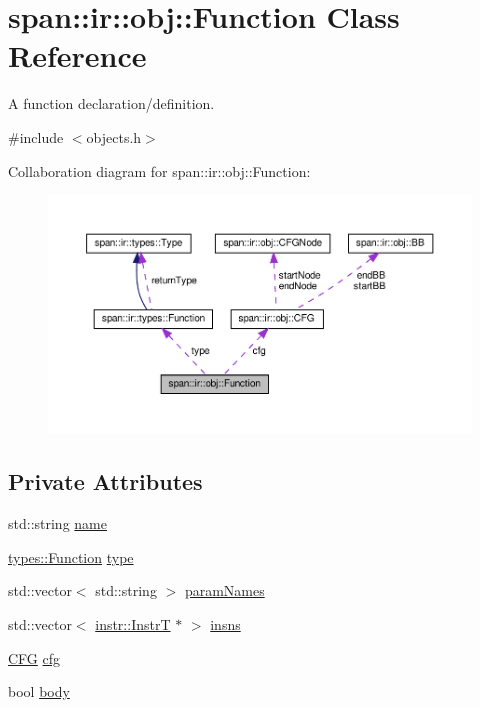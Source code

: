 \hypertarget{classspan_1_1ir_1_1obj_1_1Function}{}\section{span\+:\+:ir\+:\+:obj\+:\+:Function Class Reference}
\label{classspan_1_1ir_1_1obj_1_1Function}


A function declaration/definition.  




{\ttfamily \#include $<$objects.\+h$>$}



Collaboration diagram for span\+:\+:ir\+:\+:obj\+:\+:Function\+:\nopagebreak
\begin{figure}[H]
\begin{center}
\leavevmode
\includegraphics[width=350pt]{classspan_1_1ir_1_1obj_1_1Function__coll__graph}
\end{center}
\end{figure}
\subsection*{Private Attributes}
\begin{DoxyCompactItemize}
\item 
std\+::string \hyperlink{classspan_1_1ir_1_1obj_1_1Function_afb7dc1b55c81492a1243b75734add6ab}{name}
\item 
\hyperlink{classspan_1_1ir_1_1types_1_1Function}{types\+::\+Function} \hyperlink{classspan_1_1ir_1_1obj_1_1Function_af2916d791297d39a30c4c597b73d38b3}{type}
\item 
std\+::vector$<$ std\+::string $>$ \hyperlink{classspan_1_1ir_1_1obj_1_1Function_a1716aaabf39b86d19258a87cde9ba344}{param\+Names}
\item 
std\+::vector$<$ \hyperlink{classspan_1_1ir_1_1instr_1_1InstrT}{instr\+::\+InstrT} $\ast$ $>$ \hyperlink{classspan_1_1ir_1_1obj_1_1Function_a67f2ae04de111d711a08291b7621e6fd}{insns}
\item 
\hyperlink{classspan_1_1ir_1_1obj_1_1CFG}{C\+FG} \hyperlink{classspan_1_1ir_1_1obj_1_1Function_a992bc96ffb731851bc6773fbb11f4095}{cfg}
\item 
bool \hyperlink{classspan_1_1ir_1_1obj_1_1Function_a5c761b10e89a5b9a22804728c2bba800}{body}
\end{DoxyCompactItemize}


